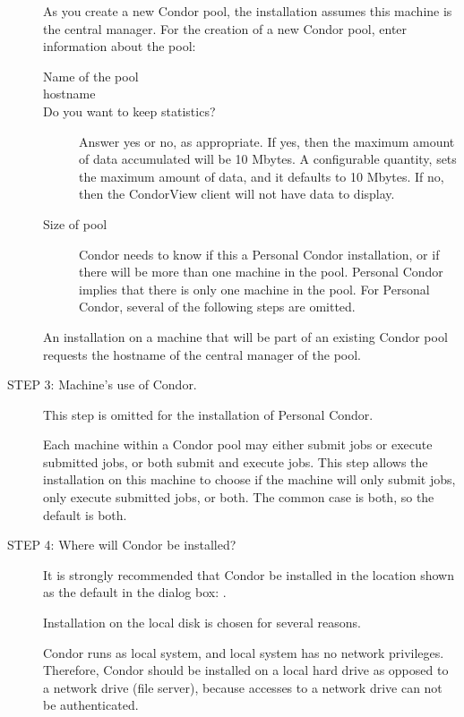 \begin{description}
     As you create a new Condor pool, the installation
     assumes this machine is the central manager.
     For the creation of a new Condor pool, enter
     information about the pool:
     \begin{description}
     \item[Name of the pool]
     \item[hostname]
     \item[Do you want to keep statistics?]
       Answer yes or no, as appropriate.
       If yes, then the maximum amount of data accumulated will
       be 10 Mbytes.
       A configurable quantity, 
       sets the maximum amount of data, and it
       defaults to 10 Mbytes.
       If no, then the CondorView client will not have data to display.
     \item[Size of pool]
       Condor needs to know if this a Personal Condor installation,
       or if there will be more than one machine in the pool.
       Personal Condor
       implies that there is only one machine in the pool.
       For Personal Condor, several of the following
       steps are omitted.
     \end{description}

     An installation on a machine that will be part of an
     existing Condor
     pool requests the hostname of the central manager
     of the pool.

\item[STEP 3: Machine's use of Condor.] 

     This step is omitted for the installation of Personal Condor.

     Each machine within a Condor pool may either
     submit jobs or execute submitted jobs, or both
     submit and execute jobs.
     This step allows the installation on this machine
     to choose if the machine will only submit jobs,
     only execute submitted jobs, or both.
     The common case is both, so the default is both.

\item[STEP 4: Where will Condor be installed?]


It is strongly recommended that Condor be installed in the
location shown as the default in the dialog box:
.

Installation on the local disk is chosen for several reasons.

Condor runs as local system, and local system
has no network privileges.
Therefore, Condor should be installed on a local hard drive
as opposed to a network drive (file server),
because accesses to a network drive can not be
authenticated.


\end{description}
